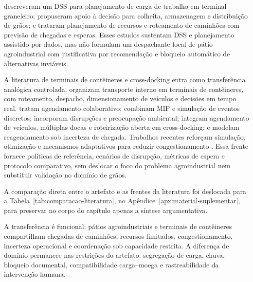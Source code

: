 \documentclass[
  12pt,
  oneside,
  a4paper,
  sumario=tradicional,
  brazil
]{abntex2}
\begin{document}
\textcite{vanderheydenDecisionSupportSystem1985a} descreveram um DSS para planejamento de carga de trabalho em terminal graneleiro; \textcite{mardanehDecisionSupportSystem2021a} propuseram apoio \`a decis\~ao para colheita, armazenagem e distribui\c{c}\~ao de gr\~aos; e \textcite{hillDecisionSupportSystem2017aa} trataram planejamento de recursos e roteamento de caminh\~oes com previs\~ao de chegadas e esperas. Esses estudos sustentam DSS e planejamento assistido por dados, mas n\~ao formulam um despachante local de p\'atio agroindustrial com justificativa por recomenda\c{c}\~ao e bloqueio autom\'atico de alternativas invi\'aveis.

A literatura de terminais de cont\^eineres e cross-docking entra como transfer\^encia anal\'ogica controlada. \textcite{carloTransportOperationsContainer2014aa} organizam transporte interno em terminais de cont\^eineres, com roteamento, despacho, dimensionamento de ve\'iculos e decis\~oes em tempo real. \textcite{phanCollaborativeTruckScheduling2016a} tratam agendamento colaborativo; \textcite{azabDynamicCollaborativeTruck2017a} combinam MIP e simula\c{c}\~ao de eventos discretos; \textcite{liDisruptionManagementTruck2018a} incorporam disrup\c{c}\~oes e preocupa\c{c}\~ao ambiental; \textcite{cotaIntegratingVehicleScheduling2022} integram agendamento de ve\'iculos, m\'ultiplas docas e roteiriza\c{c}\~ao aberta em cross-docking; e \textcite{xuDynamicAppointmentRescheduling2022} modelam reagendamento sob incerteza de chegada. Trabalhos recentes refor\c{c}am simula\c{c}\~ao, otimiza\c{c}\~ao e mecanismos adaptativos para reduzir congestionamento \parencite{bettSimulationbasedOptimizationTruck2024a, bouyahiaNovelTruckAppointment2025b}. Essa frente fornece pol\'iticas de refer\^encia, cen\'arios de disrup\c{c}\~ao, m\'etricas de espera e protocolo comparativo, sem deslocar o foco do problema agroindustrial nem substituir valida\c{c}\~ao no dom\'inio de gr\~aos.

A compara\c{c}\~ao direta entre o artefato e as frentes da literatura foi deslocada para a Tabela~\ref{tab:comparacao-literatura}, no Ap\^endice~\ref{apx:material-suplementar}, para preservar no corpo do cap\'itulo apenas a s\'intese argumentativa.

A transfer\^encia \'e funcional: p\'atios agroindustriais e terminais de cont\^eineres compartilham chegadas de caminh\~oes, recursos limitados, congestionamento, incerteza operacional e coordena\c{c}\~ao sob capacidade restrita. A diferen\c{c}a de dom\'inio permanece nas restri\c{c}\~oes do artefato: segrega\c{c}\~ao de carga, chuva, bloqueio documental, compatibilidade carga--moega e rastreabilidade da interven\c{c}\~ao humana.
\end{document}
